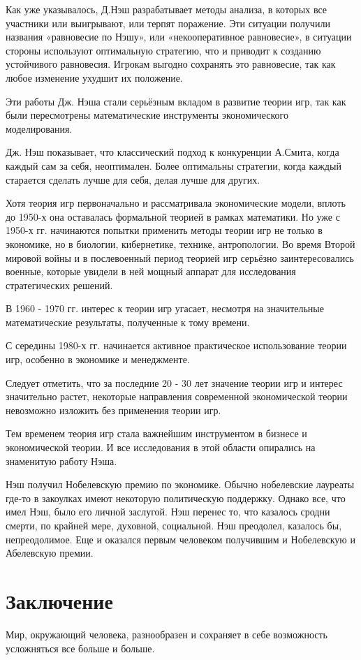 \documentclass[12pt, a4paper]{article}
\let\stdsection\section
\renewcommand\section{\newpage\stdsection}
\begin{document}
Как уже указывалось, Д.Нэш разрабатывает методы анализа, в которых все
участники или выигрывают, или терпят поражение. Эти ситуации получили названия
«равновесие по Нэшу», или «некооперативное равновесие», в ситуации стороны
используют оптимальную стратегию, что и приводит к созданию устойчивого
равновесия. Игрокам выгодно сохранять это равновесие, так как любое изменение
ухудшит их положение.

Эти работы Дж. Нэша стали серьёзным вкладом в развитие теории игр, так как
были пересмотрены математические инструменты экономического моделирования.

Дж. Нэш показывает, что классический подход к конкуренции А.Смита, когда
каждый сам за себя, неоптимален. Более оптимальны стратегии, когда каждый
старается сделать лучше для себя, делая лучше для других.

Хотя теория игр первоначально и рассматривала экономические модели, вплоть
до 1950-х она оставалась формальной теорией в рамках математики. Но уже с
1950-х гг. начинаются попытки применить методы теории игр не только в
экономике, но в биологии, кибернетике, технике, антропологии. Во время
Второй мировой войны и в послевоенный период теорией игр серьёзно
заинтересовались военные, которые увидели в ней мощный аппарат для
исследования стратегических решений.

В 1960 - 1970 гг. интерес к теории игр угасает, несмотря на значительные
математические результаты, полученные к тому времени.

С середины 1980-х гг. начинается активное практическое использование теории
игр, особенно в экономике и менеджменте.

Следует отметить, что за последние 20 - 30 лет значение теории игр и
интерес значительно растет, некоторые направления современной экономической
теории невозможно изложить без применения теории игр.

Тем временем теория игр стала важнейшим инструментом в бизнесе и
экономической теории. И все исследования в этой области опирались на
знаменитую работу Нэша.

Нэш получил Нобелевскую премию по экономике. Обычно нобелевские лауреаты
где-то в закоулках имеют некоторую политическую поддержку. Однако все,
что имел Нэш, было его личной заслугой. Нэш перенес то, что казалось
сродни смерти, по крайней мере, духовной, социальной. Нэш преодолел,
казалось бы, непреодолимое. Еще и оказался первым человеком получившим и
Нобелевскую и Абелевскую премии.

\section{Заключение}
Мир, окружающий человека, разнообразен и сохраняет в себе возможность
усложняться все больше и больше.
\end{document}
